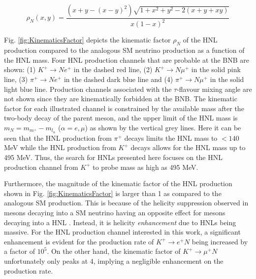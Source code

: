 \begin{equation}
	\rho_{N}(x,y) = \frac{(x+y-(x-y)^{2})\sqrt{1+x^{2}+y^{2}-2(x+y+xy)}}{x(1-x)^{2}}
\label{eq:KinematicsFactor}
\end{equation}

Fig. \ref{fig:KinematicsFactor} depicts the kinematic factor $\rho_N$ of the HNL production compared to the analogous SM neutrino production as a function of the HNL mass.
Four HNL production channels that are probable at the BNB are shown: (1) $K^+ \rightarrow Ne^+$ in the dashed red line, (2) $K^+ \rightarrow N\mu^+$ in the solid pink line, (3) $\pi^+ \rightarrow Ne^+$ in the dashed dark blue line and (4) $\pi^+ \rightarrow N\mu^+$ in the solid light blue line.  
Production channels associated with the $\tau$-flavour mixing angle are not shown since they are kinematically forbidden at the BNB.
The kinematic factor for each illustrated channel is constrained by the available mass after the two-body decay of the parent meson, and the upper limit of the HNL mass is $m_{N} = m_{m^+} - m_{l_{\alpha}}$ ($\alpha=e,\mu$) as shown by the vertical grey lines.
Here it can be seen that the HNL production from $\pi^+$ decays limits the HNL mass to $< 140$ MeV while the HNL production from $K^+$ decays allows for the HNL mass up to 495 MeV. 
Thus, the search for HNLs presented here focuses on the HNL production channel from $K^+$ to probe mass as high as 495 MeV.




Furthermore, the magnitude of the kinematic factor of the HNL production shown in Fig. \ref{fig:KinematicsFactor} is larger than 1 as compared to the analogous SM production.
This is because of the helicity suppression observed in mesons decaying into a SM neutrino having an opposite effect for mesons decaying into a HNL \cite{HNLKelly}.
Instead, it is helicity \textit{enhancement} due to HNLs being massive.
For the HNL production channel interested in this work, a significant enhancement is evident for the production rate of $K^+\rightarrow e^+ N$ being increased by a factor of $10^{5}$.
On the other hand, the kinematic factor of $K^+ \rightarrow \mu^+ N$ unfortunately only peaks at 4, implying a negligible enhancement on the production rate. 


